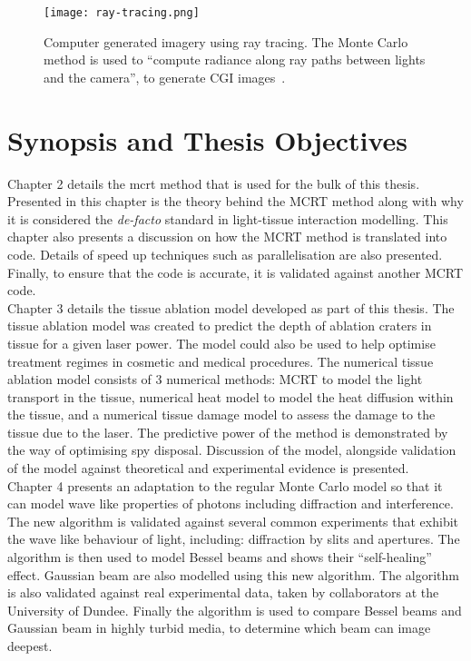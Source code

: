 \begin{figure}[!htbp]
\centering
\texttt{[image: ray-tracing.png]}
\caption{Computer generated imagery using ray tracing. The Monte Carlo method is used to ``compute radiance along ray paths between lights and the camera'', to generate CGI images~\cite{pharr2016physically}.}
\label{fig:ray-trace}
\end{figure}


\section{Synopsis and Thesis Objectives}

Chapter 2 details the \gls*{mcrt} method that is used for the bulk of this thesis.
Presented in this chapter is the theory behind the MCRT method along with why it is considered the \textit{de-facto} standard in light-tissue interaction modelling.
This chapter also presents a discussion on how the MCRT method is translated into code.
Details of speed up techniques such as parallelisation are also presented.
Finally, to ensure that the code is accurate, it is validated against another MCRT code.\\


Chapter 3 details the tissue ablation model developed as part of this thesis.
The tissue ablation model was created to predict the depth of ablation craters in tissue for a given laser power.
The model could also be used to help optimise treatment regimes in cosmetic and medical procedures.
The numerical tissue ablation model consists of 3 numerical methods: MCRT to model the light transport in the tissue, numerical heat model to model the heat diffusion within the tissue, and a numerical tissue damage model to assess the damage to the tissue due to the laser.
The predictive power of the method is demonstrated by the way of optimising spy disposal.
Discussion of the model, alongside validation of the model against theoretical and experimental evidence is presented.\\


Chapter 4 presents an adaptation to the regular Monte Carlo model so that it can model wave like properties of photons including diffraction and interference.
The new algorithm is validated against several common experiments that exhibit the wave like behaviour of light, including: diffraction by slits and apertures.
The algorithm is then used to model Bessel beams and shows their ``self-healing'' effect.
Gaussian beam are also modelled using this new algorithm.
The algorithm is also validated against real experimental data, taken by collaborators at the University of Dundee.
Finally the algorithm is used to compare Bessel beams and Gaussian beam in highly turbid media, to determine which beam can image deepest.\\


